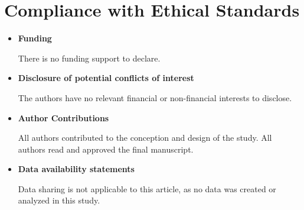 \documentclass[12pt,a4paper]{amsart}
\theoremstyle{definition}
\begin{document}
\section{Compliance with Ethical Standards}
\begin{itemize}
\item {\bf Funding}

There is no funding support to declare.

\item {\bf Disclosure of potential conflicts of interest}



The authors have no relevant financial or non-financial interests to disclose.


\item {\bf Author Contributions}

All authors contributed to the conception and design of the study.  All authors read and approved the final manuscript.

\item {\bf Data availability statements}

Data sharing is not applicable to this article, as no data was created or analyzed in this study.\\



\end{itemize}
\end{document}
